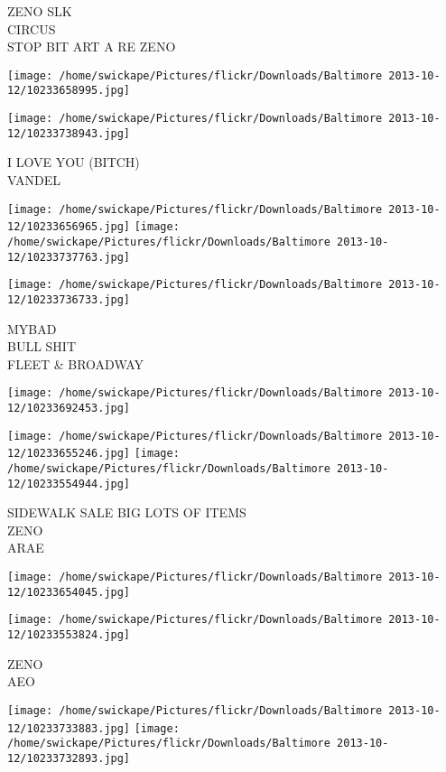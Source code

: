 \documentclass[10pt,letterpaper]{article}
\begin{document}
ZENO SLK\\
CIRCUS\\
STOP BIT ART A RE ZENO
\pagebreak

\texttt{[image: /home/swickape/Pictures/flickr/Downloads/Baltimore 2013-10-12/10233658995.jpg]}

\vspace{0.25in}
\texttt{[image: /home/swickape/Pictures/flickr/Downloads/Baltimore 2013-10-12/10233738943.jpg]}

I LOVE YOU (BITCH)\\
VANDEL
\pagebreak

\texttt{[image: /home/swickape/Pictures/flickr/Downloads/Baltimore 2013-10-12/10233656965.jpg]}
\texttt{[image: /home/swickape/Pictures/flickr/Downloads/Baltimore 2013-10-12/10233737763.jpg]}

\texttt{[image: /home/swickape/Pictures/flickr/Downloads/Baltimore 2013-10-12/10233736733.jpg]}

MYBAD\\
BULL SHIT\\
FLEET \& BROADWAY
\pagebreak

\texttt{[image: /home/swickape/Pictures/flickr/Downloads/Baltimore 2013-10-12/10233692453.jpg]}

\vspace{0.25in}
\texttt{[image: /home/swickape/Pictures/flickr/Downloads/Baltimore 2013-10-12/10233655246.jpg]}
\texttt{[image: /home/swickape/Pictures/flickr/Downloads/Baltimore 2013-10-12/10233554944.jpg]}

SIDEWALK SALE BIG LOTS OF ITEMS\\
ZENO\\
ARAE
\pagebreak

\texttt{[image: /home/swickape/Pictures/flickr/Downloads/Baltimore 2013-10-12/10233654045.jpg]}

\vspace{0.25in}
\texttt{[image: /home/swickape/Pictures/flickr/Downloads/Baltimore 2013-10-12/10233553824.jpg]}

ZENO\\
AEO
\pagebreak

\texttt{[image: /home/swickape/Pictures/flickr/Downloads/Baltimore 2013-10-12/10233733883.jpg]}
\texttt{[image: /home/swickape/Pictures/flickr/Downloads/Baltimore 2013-10-12/10233732893.jpg]}
\end{document}
